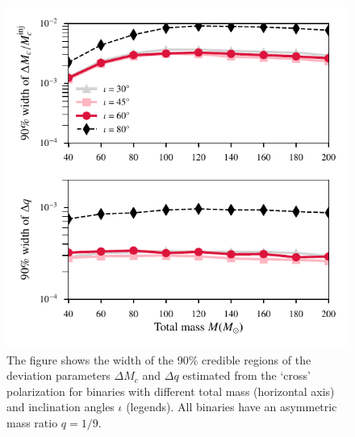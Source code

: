\documentclass[prd,preprintnumbers,twocolumn,eqsecnum,floatfix,a4paper,nofootinbib,superscriptaddress]{revtex4}
\begin{document}
\begin{figure}[h]
	\begin{center}
		\includegraphics[scale=0.78]{figs/hp_hc_consistency_confidence_interval_varying_M.pdf}
	\end{center} 
	\caption{The figure shows the width of the 90$\%$ credible regions of the deviation parameters $\Delta M_c$ and $\Delta q$ estimated from the `cross' polarization for binaries with different total mass (horizontal axis) and inclination angles $\iota$ (legends). All binaries have an asymmetric mass ratio $q=1/9$.}
	\label{fig:hp_hc_90_CI_diffM}
\end{figure}
\end{document}
